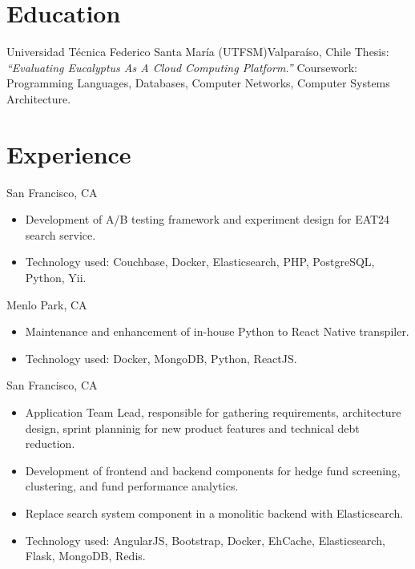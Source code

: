 \documentclass[sans,letter]{moderncv}
\begin{document}
\maketitle


\section{Education}

{Universidad Técnica Federico Santa María (UTFSM)}{Valparaíso, Chile}{
Thesis: \em ``Evaluating Eucalyptus As A Cloud Computing Platform.''
}{
Coursework: Programming Languages, Databases, Computer Networks, Computer Systems Architecture.
}


\section{Experience}

{San Francisco, CA}{}
{\begin{itemize}
  \item Development of A/B testing framework and experiment design for EAT24 search service.
  \item Technology used: Couchbase, Docker, Elasticsearch, PHP, PostgreSQL, Python, Yii.
\end{itemize}}

{Menlo Park, CA}{}
{\begin{itemize}
  \item Maintenance and enhancement of in-house Python to React Native transpiler.
  \item Technology used: Docker, MongoDB, Python, ReactJS.
\end{itemize}}

{San Francisco, CA}{}
{\begin{itemize}
  \item Application Team Lead, responsible for gathering requirements,
  architecture design, sprint planninig for new product features and
  technical debt reduction.
  \item Development of frontend and backend components for hedge fund
  screening, clustering, and fund performance analytics.
  \item Replace search system component in a monolitic backend with Elasticsearch.
  \item Technology used: AngularJS, Bootstrap, Docker, EhCache, Elasticsearch, Flask, MongoDB, Redis.
\end{itemize}}
\end{document}
